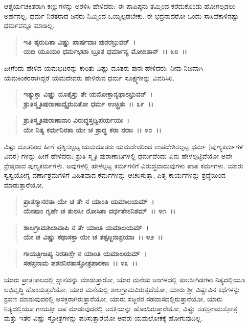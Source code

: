 ಆಶ್ಚರ್ಯಚಕಿತರಾಗಿ ಕಣ್ಣುಗಳನ್ನು ಅರಳಿಸಿ ಹೇಳಿದರು: ಈ ಪಾಪಿಷ್ಠನು ತಮ್ಮಿಂದ ಕರೆದುಕೊಂಡು ಹೋಗಲ್ಪಡಲು ಅರ್ಹನಲ್ಲ. ಧರ್ಮ ನಿರತರಾದ ಜನರು ನಿಮ್ಮಿಂದ ಒಯ್ಯಲ್ಪಡಬೇಕು. ಈ ಭದ್ರನಾದರೋ ಒಂದು ಸಾಸಿವೆಕಾಳಿನಷ್ಟು ಧರ್ಮವನ್ನೂ ಮಾಡಿಲ್ಲ.

\begin{verse}
\textbf{ಇತಿ ತೈರುದಿತಾ ವಿಷ್ಣು ಪಾರ್ಷದಾಃ ಪುನರಬ್ರುವನ್~।}\\\textbf{ಯದಿ ಯೂಯಂ ಧರ್ಮಭಟಾ ಬ್ರೂತ ಧರ್ಮಾನ್ಯ ಮೋದಿತಾನ್~।। ೩೮~।।}
\end{verse}

ಹೀಗೆಂದು ಹೇಳಿದ ಯಮಭಟರನ್ನು ಕುರಿತು ವಿಷ್ಣು ದೂತರು ಪುನಃ ಹೇಳಿದರು: ನೀವು ನಿಜವಾಗಿ ಯಮಕಿಂಕರರಾಗಿದ್ದರೆ ಯಮದೇವರು ಹೇಳಿರುವ ಧರ್ಮ ಸೂಕ್ಷ್ಮಗಳನ್ನು ವಿವರಿಸಿರಿ.

\begin{verse}
\textbf{ಇತ್ಯುಕ್ತಾ ವಿಷ್ಣು ದೂತೈಸ್ತು ತೇ ಯಮೋಕ್ತಾನ್ಯಥಾಽಭ್ರುವನ್~।}\\\textbf{ಶ್ರುತಿಸ್ಮೃತಿಪುರಾಣಾದ್ಯೈರುದಿತೋ ಧರ್ಮ ಉಚ್ಛ್ರಿತಃ~।। ೩೯~।।} 
\end{verse}

\begin{verse}
\textbf{ಶ್ರುತಿಸ್ಮೃತಿಪುರಾಣಾನಾಂ ವಿರುದ್ಧಸ್ತದ್ವಿಪರ್ಯಯಃ~।}\\\textbf{ಯೇ ನಿತ್ಯ ಕರ್ಮನಿರತಾ ಯೇ ಚ ಶ್ರಾದ್ಧ ಕರಾ ನರಾಃ~।। ೪೦~।।}
\end{verse}

ವಿಷ್ಟು ದೂತರಿಂದ ಹೀಗೆ ಪ್ರಶ್ನಿಸಲ್ಪಟ್ಟ ಯಮದೂತರು ಯಮದೇವರಿಂದ ಉಪದೇಶಿಸಲ್ಪಟ್ಟ ಧರ್ಮ (ಪುಣ್ಯಕರ್ಮಗಳ ವಿವರ) ಗಳನ್ನು ಹೀಗೆ ಹೇಳಿದರು: ಶ್ರುತಿ ಸ್ಮೃತಿ ಪುರಾಣಾದಿಗಳಲ್ಲಿ ಧರ್ಮವೆಂದು ಏನು ಹೇಳಲ್ಪಟ್ಟಿವೆಯೋ ಅವೇ ಶ್ರೇಷ್ಠವಾದ ಪುಣ್ಯಕರ್ಮಗಳು. ಅವುಗಳಲ್ಲಿ ಹೇಳಲ್ಪಟ್ಟ ಕರ್ಮಗಳಿಗೆ ವಿರುದ್ಧವಾದುವುಗಳು ಪಾಪ ಕರ್ಮಗಳು. ಯಾರು ಸ್ವಸ್ವಯೋಗ್ಯ ವರ್ಣಾಶ್ರಮಗಳಿಗೆ ವಿಹಿತವಾದ ಕರ್ಮಗಳನ್ನು ಆಚರಿಸುತ್ತಾ, ಪಿತೃ ಕಾರ್ಯಗಳನ್ನು ಶ್ರದ್ಧೆಯಿಂದ ಮಾಡುತ್ತಾರೆಯೋ,

\begin{verse}
\textbf{ಪ್ರಾತಸ್ಮಾನರತಾ ಯೇ ಚ ತೇ ನ ಯಾಂತಿ ಯಮಾಲಯಮ್~।}\\\textbf{ಯೇಷಾಂ ಗೃಹೇ ಚ ತುಲಸೀ ರೋಸಿತಾ ವರ್ಧತೇಽನಿಶಮ್~।। ೪೧~।। }
\end{verse}

\begin{verse}
\textbf{ಶಾಲಗ್ರಾಮಶಿಲಾವಾಪಿ ನ ತೇ ಯಾಂತಿ ಯಮಾಲಯಮ್~।}\\\textbf{ಯೇ ಚ ವಿಷ್ಣು ಕಥಾಸಕ್ತಾ ಯೇ ಚ ತತ್ಸಜ್ಜನಾಶ್ರಯಾಃ~।। ೪೨~।।}
\end{verse}

\begin{verse}
\textbf{ಗಾಯತ್ರೀಜಪ್ಯ ನಿರತಾಸ್ತೇ ನ ಯಾಂತಿ ಯಮಾಲಯಮ್~।}\\\textbf{ಸಹಸ್ರನಾಮ ಪಠನನಿರತಾಸ್ತೋತ್ರಪಾಠಕಾಃ~।। ೪೩~।।}
\end{verse}

ಯಾರು ಪ್ರಾತಃಕಾಲದಲ್ಲಿ ಸ್ನಾನವನ್ನು ಮಾಡುತ್ತಾರೋ, ಯಾರ ಮನೆಯ ಅಂಗಳದಲ್ಲಿ ತುಲಸೀಗಿಡಗಳು ನಿತ್ಯದಲ್ಲಿಯೂ ಅಭಿವೃದ್ಧಿ ಹೊಂದುತ್ತವೆಯೋ, ಯಾರ ಮನೆಯಲ್ಲಿ ಶಾಲಗ್ರಾಮವಿರುತ್ತದೆಯೋ, ಯಾರು ಶ‍್ರೀ ವಿಷ್ಣುವಿನ ಕಥೆಗಳನ್ನು ಶ್ರವಣ ಮಾಡುವುದರಲ್ಲಿ ಆಸಕ್ತರಾಗಿರುತ್ತಾರೆಯೋ, ಯಾರು ಸಜ್ಜನರ ಸಹವಾಸದಲ್ಲಿರುತ್ತಾರೆಯೋ, ಯಾರು ನಿತ್ಯದಲ್ಲಿಯೂ ಗಾಯತ್ರೀ ಜಪ ಮಾಡುವುದರಲ್ಲಿ ಆಸಕ್ತಿಯನ್ನು ಹೊಂದಿರುತ್ತಾರೆಯೋ, ವಿಷ್ಣು ಸಹಸ್ರನಾಮಸ್ತೋತ್ರ ಮತ್ತು ಇತರ ವಿಷ್ಣು ಸ್ತೋತ್ರಗಳನ್ನು ಪಠಿಸುತ್ತಾರೆಯೋ ಅವರು ಯಮಲೋಕಕ್ಕೆ ಹೋಗುವುದಿಲ್ಲ.


